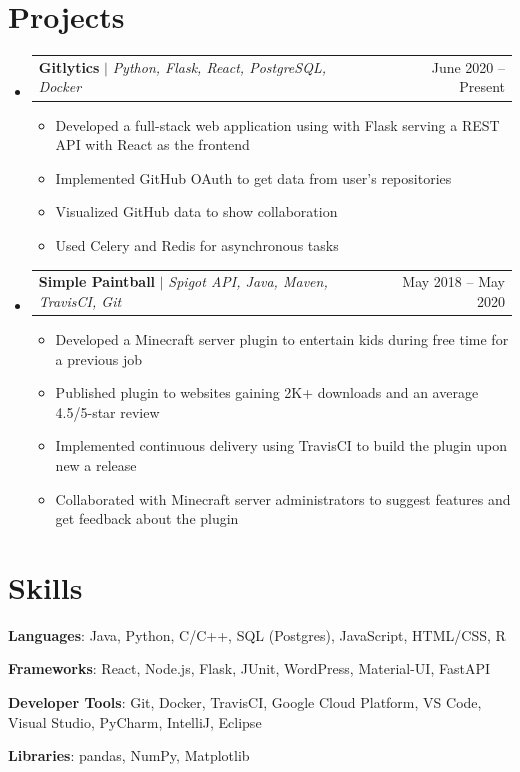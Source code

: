\documentclass[letterpaper,11pt]{article}
\makeatletter
\newcommand{\resumeItem}[1]{
  \item\small{
    {#1 \vspace{-2pt}}
  }
}
\newcommand{\resumeProjectHeading}[2]{
    \item
    \begin{tabular*}{0.97\textwidth}{l@{\extracolsep{\fill}}r}
      \small#1 & #2 \\
    \end{tabular*}\vspace{-7pt}
}
\newcommand{\resumeSubHeadingListStart}{\begin{itemize}[leftmargin=0.15in, label={}]}
\newcommand{\resumeSubHeadingListEnd}{\end{itemize}}
\newcommand{\resumeItemListStart}{\begin{itemize}}
\newcommand{\resumeItemListEnd}{\end{itemize}\vspace{-5pt}}
\makeatother
\begin{document}
\section{Projects}
\resumeSubHeadingListStart
\resumeProjectHeading
  {\textbf{Gitlytics} $|$ \emph{Python, Flask, React, PostgreSQL, Docker}}{June 2020 -- Present}
\resumeItemListStart
\resumeItem{Developed a full-stack web application using with Flask serving a REST API with React as the frontend}
\resumeItem{Implemented GitHub OAuth to get data from user’s repositories}
\resumeItem{Visualized GitHub data to show collaboration}
\resumeItem{Used Celery and Redis for asynchronous tasks}
\resumeItemListEnd
\resumeProjectHeading
  {\textbf{Simple Paintball} $|$ \emph{Spigot API, Java, Maven, TravisCI, Git}}{May 2018 -- May 2020}
\resumeItemListStart
\resumeItem{Developed a Minecraft server plugin to entertain kids during free time for a previous job}
\resumeItem{Published plugin to websites gaining 2K+ downloads and an average 4.5/5-star review}
\resumeItem{Implemented continuous delivery using TravisCI to build the plugin upon new a release}
\resumeItem{Collaborated with Minecraft server administrators to suggest features and get feedback about the plugin}
\resumeItemListEnd
\resumeSubHeadingListEnd
\section{Skills}
\resumeSubHeadingListStart
\small{\item{\textbf{Languages}{: Java, Python, C/C++, SQL (Postgres), JavaScript, HTML/CSS, R}}}
\small{\item{\textbf{Frameworks}{: React, Node.js, Flask, JUnit, WordPress, Material-UI, FastAPI}}}
\small{\item{\textbf{Developer Tools}{: Git, Docker, TravisCI, Google Cloud Platform, VS Code, Visual Studio, PyCharm, IntelliJ, Eclipse}}}
\small{\item{\textbf{Libraries}{: pandas, NumPy, Matplotlib}}}
\resumeSubHeadingListEnd
\end{document}
